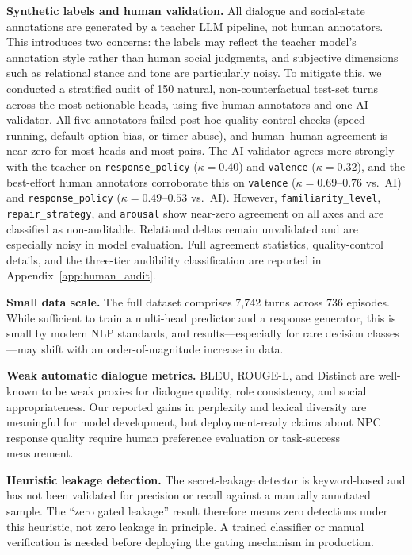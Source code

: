 \documentclass[11pt]{article}
\begin{document}
\textbf{Synthetic labels and human validation.}
All dialogue and social-state annotations are generated by a teacher LLM pipeline, not human annotators.
This introduces two concerns: the labels may reflect the teacher model's annotation style rather than human social judgments, and subjective dimensions such as relational stance and tone are particularly noisy.
To mitigate this, we conducted a stratified audit of 150 natural, non-counterfactual test-set turns across the most actionable heads, using five human annotators and one AI validator.
All five annotators failed post-hoc quality-control checks (speed-running, default-option bias, or timer abuse), and human--human agreement is near zero for most heads and most pairs.
The AI validator agrees more strongly with the teacher on \texttt{response\_policy} ($\kappa{=}0.40$) and \texttt{valence} ($\kappa{=}0.32$), and the best-effort human annotators corroborate this on \texttt{valence} ($\kappa{=}0.69$--$0.76$ vs.\ AI) and \texttt{response\_policy} ($\kappa{=}0.49$--$0.53$ vs.\ AI).
However, \texttt{familiarity\_level}, \texttt{repair\_strategy}, and \texttt{arousal} show near-zero agreement on all axes and are classified as non-auditable.
Relational deltas remain unvalidated and are especially noisy in model evaluation.
Full agreement statistics, quality-control details, and the three-tier audibility classification are reported in Appendix~\ref{app:human_audit}.

\textbf{Small data scale.}
The full dataset comprises 7,742 turns across 736 episodes.
While sufficient to train a multi-head predictor and a response generator, this is small by modern NLP standards, and results---especially for rare decision classes---may shift with an order-of-magnitude increase in data.

\textbf{Weak automatic dialogue metrics.}
BLEU, ROUGE-L, and Distinct are well-known to be weak proxies for dialogue quality, role consistency, and social appropriateness.
Our reported gains in perplexity and lexical diversity are meaningful for model development, but deployment-ready claims about NPC response quality require human preference evaluation or task-success measurement.

\textbf{Heuristic leakage detection.}
The secret-leakage detector is keyword-based and has not been validated for precision or recall against a manually annotated sample.
The ``zero gated leakage'' result therefore means zero detections under this heuristic, not zero leakage in principle.
A trained classifier or manual verification is needed before deploying the gating mechanism in production.
\end{document}
